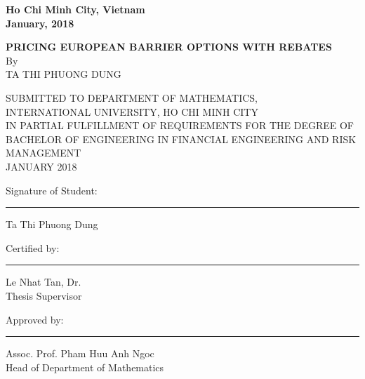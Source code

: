 \documentclass[12pt,a4paper,left=2cm,right=2cm,oneside,titlepage]{report}
\numberwithin{equation}{section}
\begin{document}
\vspace{4.4cm}

\begin{center}
	\fontsize{12pt}{18pt}\selectfont \textbf{Ho Chi Minh City, Vietnam\\
	January, 2018}
\end{center}

\newpage

\begin{center}
	\fontsize{11pt}{18pt}\selectfont \textbf{PRICING EUROPEAN BARRIER OPTIONS WITH REBATES}\\
	\fontsize{11pt}{18pt}\selectfont By\\
	TA THI PHUONG DUNG\\ \vspace{18pt}

	SUBMITTED TO DEPARTMENT OF MATHEMATICS,\\
	INTERNATIONAL UNIVERSITY, HO CHI MINH CITY\\
	IN PARTIAL FULFILLMENT OF REQUIREMENTS FOR THE DEGREE OF\\ BACHELOR OF ENGINEERING IN FINANCIAL ENGINEERING AND RISK MANAGEMENT\\
	JANUARY 2018 	
\end{center}

	\vspace{54pt}	
\fontsize{12pt}{0pt}\selectfont Signature of Student: \hspace{50pt}\rule[0.02cm]{8cm}{0.0006cm}
\begin{flushright}
	Ta Thi Phuong Dung
\end{flushright} \vspace{18pt}
\hspace{14pt} \fontsize{12pt}{0pt}\selectfont Certified by: \hspace{94pt}\rule[0.02cm]{8cm}{0.0006cm}
\begin{flushright}
	Le Nhat Tan, Dr.\\ \vspace{10pt}
	Thesis Supervisor
\end{flushright}  \vspace{18pt}
\hspace{14pt} \fontsize{12pt}{0pt}\selectfont Approved by: \hspace{90pt}\rule[0.02cm]{8cm}{0.0006cm}
\begin{flushright}
	Assoc. Prof. Pham Huu Anh Ngoc\\ \vspace{10pt}
	Head of Department of Mathematics
\end{flushright}
\end{document}
